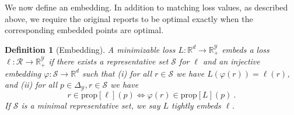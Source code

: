 \documentclass[11pt]{article}
\newcommand{\Comments}{1}
\newcommand{\mytodo}[2]{\ifnum\Comments=1%
  \todo[linecolor=#1!80!black,backgroundcolor=#1,bordercolor=#1!80!black]{#2}\fi}
\newcommand{\raft}[1]{\mytodo{green!20!white}{RF: #1}}
\newcommand{\reals}{\mathbb{R}}
\newcommand{\prop}[1]{\mathrm{prop}[#1]}
\newcommand{\simplex}{\Delta_\Y}
\newcommand{\R}{\mathcal{R}}
\newcommand{\Sc}{\mathcal{S}}
\newcommand{\Y}{\mathcal{Y}}
\newcommand{\inprod}[2]{\langle #1, #2 \rangle}%
\DeclareMathOperator*{\argmin}{arg\,min}
\newtheorem{definition}{Definition}
\begin{document}

We now define an embedding.
In addition to matching loss values, as described above, we require the original reports to be optimal exactly when the corresponding embedded points are optimal.
\begin{definition}[Embedding]\label{def:loss-embed}
  A minimizable loss $L:\reals^d\to\reals^\Y_+$ \emph{embeds} a loss $\ell:\R\to\reals^\Y_+$ if there exists a representative set $\Sc$ for $\ell$ and an injective embedding $\varphi:\Sc\to\reals^d$ such that
  (i) for all $r\in\Sc$ we have $L(\varphi(r)) = \ell(r)$, and (ii) for all $p\in\simplex,r\in\Sc$ we have
  \begin{equation}\label{eq:embed-loss}
    r \in \prop{\ell}(p) \iff \varphi(r) \in \prop{L}(p)~.
  \end{equation}
  If $\Sc$ is a minimal representative set, we say $L$ \emph{tightly embeds} $\ell$.
\end{definition}
\end{document}

